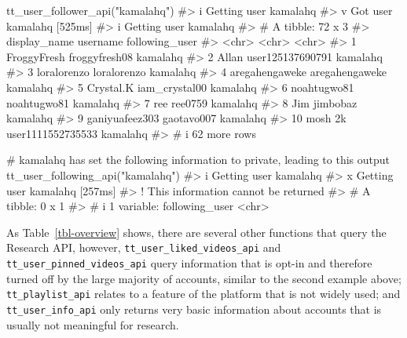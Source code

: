 \documentclass[
  nobib]{ccr}
\newenvironment{Shaded}{\begin{snugshade}}{\end{snugshade}}
\newcommand{\CommentTok}[1]{\textcolor[rgb]{0.37,0.37,0.37}{#1}}
\newcommand{\FunctionTok}[1]{\textcolor[rgb]{0.28,0.35,0.67}{#1}}
\newcommand{\NormalTok}[1]{\textcolor[rgb]{0.00,0.23,0.31}{#1}}
\newcommand{\StringTok}[1]{\textcolor[rgb]{0.13,0.47,0.30}{#1}}
\begin{document}
\begin{Shaded}
\begin{Highlighting}[]
\FunctionTok{tt\_user\_follower\_api}\NormalTok{(}\StringTok{"kamalahq"}\NormalTok{)}
\CommentTok{\#\textgreater{} i Getting user kamalahq}
\CommentTok{\#\textgreater{} v Got user kamalahq [525ms]}
\CommentTok{\#\textgreater{} i Getting user kamalahq}
\CommentTok{\#\textgreater{} \# A tibble: 72 x 3}
\CommentTok{\#\textgreater{}    display\_name   username          following\_user}
\CommentTok{\#\textgreater{}    \textless{}chr\textgreater{}          \textless{}chr\textgreater{}             \textless{}chr\textgreater{}         }
\CommentTok{\#\textgreater{}  1 FroggyFresh    froggyfresh08     kamalahq      }
\CommentTok{\#\textgreater{}  2 Allan          user125137690791  kamalahq      }
\CommentTok{\#\textgreater{}  3 loralorenzo    loralorenzo       kamalahq      }
\CommentTok{\#\textgreater{}  4 aregahengaweke aregahengaweke    kamalahq      }
\CommentTok{\#\textgreater{}  5 Crystal.K      iam\_crystal00     kamalahq      }
\CommentTok{\#\textgreater{}  6 noahtugwo81    noahtugwo81       kamalahq      }
\CommentTok{\#\textgreater{}  7 ree            ree0759           kamalahq      }
\CommentTok{\#\textgreater{}  8 Jim            jimbobaz          kamalahq      }
\CommentTok{\#\textgreater{}  9 ganiyuafeez303 gaotavo007        kamalahq      }
\CommentTok{\#\textgreater{} 10 mosh 2k        user1111552735533 kamalahq      }
\CommentTok{\#\textgreater{} \# i 62 more rows}

\CommentTok{\# kamalahq has set the following information to private, leading to this output}
\FunctionTok{tt\_user\_following\_api}\NormalTok{(}\StringTok{"kamalahq"}\NormalTok{)}
\CommentTok{\#\textgreater{} i Getting user kamalahq}
\CommentTok{\#\textgreater{} x Getting user kamalahq [257ms]}
\CommentTok{\#\textgreater{} ! This information cannot be returned}
\CommentTok{\#\textgreater{} \# A tibble: 0 x 1}
\CommentTok{\#\textgreater{} \# i 1 variable: following\_user \textless{}chr\textgreater{}}
\end{Highlighting}
\end{Shaded}

As Table~\ref{tbl-overview} shows, there are several other functions
that query the Research API, however,
\texttt{tt\_user\_liked\_videos\_api} and
\texttt{tt\_user\_pinned\_videos\_api} query information that is opt-in
and therefore turned off by the large majority of accounts, similar to
the second example above; \texttt{tt\_playlist\_api} relates to a
feature of the platform that is not widely used; and
\texttt{tt\_user\_info\_api} only returns very basic information about
accounts that is usually not meaningful for research.
\end{document}

